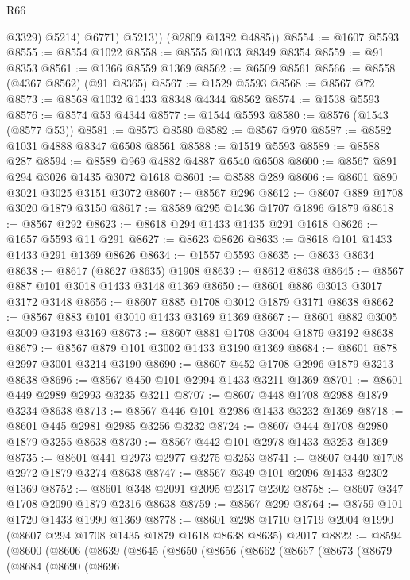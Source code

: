 \begin{lexlean}{R66}
\begin{coremodule}
                @3329)
              @5214)
            @6771)
          @5213))
      (@2809 @1382 @4885))
@8554 := @1607 @5593
@8555 := @8554 @1022
@8558 := @8555 @1033 @8349 @8354
@8559 := @91 @8353
@8561 := @1366 @8559 @1369
@8562 := @6509 @8561
@8566 := @8558 (@4367 @8562) (@91 @8365)
@8567 := @1529 @5593
@8568 := @8567 @72
@8573 := @8568 @1032 @1433 @8348 @4344 @8562
@8574 := @1538 @5593
@8576 := @8574 @53 @4344
@8577 := @1544 @5593
@8580 := @8576 (@1543 (@8577 @53))
@8581 := @8573 @8580
@8582 := @8567 @970
@8587 := @8582 @1031 @4888 @8347 @6508 @8561
@8588 := @1519 @5593
@8589 := @8588 @287
@8594 := @8589 @969 @4882 @4887 @6540 @6508
@8600 := @8567 @891 @294 @3026 @1435 @3072 @1618
@8601 := @8588 @289
@8606 := @8601 @890 @3021 @3025 @3151 @3072
@8607 := @8567 @296
@8612 := @8607 @889 @1708 @3020 @1879 @3150
@8617 := @8589 @295 @1436 @1707 @1896 @1879
@8618 := @8567 @292
@8623 := @8618 @294 @1433 @1435 @291 @1618
@8626 := @1657 @5593 @11 @291
@8627 := @8623 @8626
@8633 := @8618 @101 @1433 @1433 @291 @1369 @8626
@8634 := @1557 @5593
@8635 := @8633 @8634
@8638 := @8617 (@8627 @8635) @1908
@8639 := @8612 @8638
@8645 := @8567 @887 @101 @3018 @1433 @3148 @1369
@8650 := @8601 @886 @3013 @3017 @3172 @3148
@8656 := @8607 @885 @1708 @3012 @1879 @3171 @8638
@8662 := @8567 @883 @101 @3010 @1433 @3169 @1369
@8667 := @8601 @882 @3005 @3009 @3193 @3169
@8673 := @8607 @881 @1708 @3004 @1879 @3192 @8638
@8679 := @8567 @879 @101 @3002 @1433 @3190 @1369
@8684 := @8601 @878 @2997 @3001 @3214 @3190
@8690 := @8607 @452 @1708 @2996 @1879 @3213 @8638
@8696 := @8567 @450 @101 @2994 @1433 @3211 @1369
@8701 := @8601 @449 @2989 @2993 @3235 @3211
@8707 := @8607 @448 @1708 @2988 @1879 @3234 @8638
@8713 := @8567 @446 @101 @2986 @1433 @3232 @1369
@8718 := @8601 @445 @2981 @2985 @3256 @3232
@8724 := @8607 @444 @1708 @2980 @1879 @3255 @8638
@8730 := @8567 @442 @101 @2978 @1433 @3253 @1369
@8735 := @8601 @441 @2973 @2977 @3275 @3253
@8741 := @8607 @440 @1708 @2972 @1879 @3274 @8638
@8747 := @8567 @349 @101 @2096 @1433 @2302 @1369
@8752 := @8601 @348 @2091 @2095 @2317 @2302
@8758 := @8607 @347 @1708 @2090 @1879 @2316 @8638
@8759 := @8567 @299
@8764 := @8759 @101 @1720 @1433 @1990 @1369
@8778 := @8601 @298 @1710 @1719 @2004 @1990 (@8607 @294 @1708 @1435 @1879 @1618 @8638 @8635) @2017
@8822 := @8594
    (@8600
      (@8606
        (@8639
          (@8645
            (@8650
              (@8656
                (@8662
                  (@8667
                    (@8673
                      (@8679
                        (@8684
                          (@8690
                            (@8696

\end{coremodule}
\end{lexlean}
